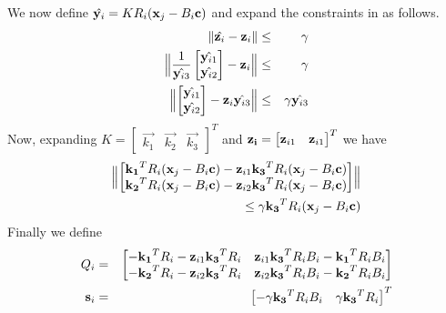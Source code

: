 We now define $\hat{\mathbf{y}_i} = K R_i (\mathbf{x}_j - B_i \mathbf{c})$ and
expand the constraints in  as follows.
\begin{eqnarray}
  \| \hat{\mathbf{z}_i} - \mathbf{z}_i \| &\leq& \gamma \\
  \Bigl\| \frac{1}{\hat{\mathbf{y}_{i3}}}
  \begin{bmatrix}
    \hat{\mathbf{y}_{i1}} \\
      \hat{\mathbf{y}_{i2}}
  \end{bmatrix}
  - \mathbf{z}_i \Bigr\| &\leq& \gamma \\
  \Bigl\|
  \begin{bmatrix}
    \hat{\mathbf{y}_{i1}} \\
      \hat{\mathbf{y}_{i2}}
  \end{bmatrix} 
  - \mathbf{z}_i \hat{\mathbf{y}_{i3}} \Bigr\| &\leq& \gamma \hat{\mathbf{y}_{i3}}
\end{eqnarray}
Now, expanding
$K=\begin{bmatrix}\vec{k_1}&\vec{k_2}&\vec{k_3}\end{bmatrix}^T$ and
$\mathbf{\mathbf{z}_i}=\begin{bmatrix}\mathbf{z}_{i1}&\mathbf{z}_{i1}\end{bmatrix}^T$
we have
\begin{equation}
  \begin{split}
  \Bigl\|
  \begin{bmatrix}
    \mathbf{k_1}^T R_i (\mathbf{x}_j - B_i \mathbf{c})
    - \mathbf{z}_{i1} \mathbf{k_3}^T R_i (\mathbf{x}_j - B_i \mathbf{c})\\
    \mathbf{k_2}^T R_i (\mathbf{x}_j - B_i \mathbf{c})
    - \mathbf{z}_{i2} \mathbf{k_3}^T R_i (\mathbf{x}_j - B_i \mathbf{c})\\
  \end{bmatrix} 
  \Bigr\|\\
  \leq
  \gamma \mathbf{k_3}^T R_i (\mathbf{x}_j - B_i \mathbf{c})
  \end{split}
\end{equation}
Finally we define
\begin{eqnarray*}
  Q_i &=& \begin{bmatrix}
    -\vec{k_1}^TR_i - \Feature_{i1} \vec{k_3}^T R_i &
    \Feature_{i1}\vec{k_3}^TR_i \SplineCoefs_i - \vec{k_1}^T R_i
    \SplineCoefs_i \\
    -\vec{k_2}^TR_i - \Feature_{i2} \vec{k_3}^T R_i &
    \Feature_{i2}\vec{k_3}^TR_i \SplineCoefs_i - \vec{k_2}^T R_i
    \SplineCoefs_i
  \end{bmatrix} \\
  \vec{s}_i &=& \begin{bmatrix}
    -\Tol \vec{k_3}^T R_i \SplineCoefs_i &
    \Tol \vec{k_3}^T R_i
  \end{bmatrix}^T
  \label{socp-constraints}
\end{eqnarray*}
